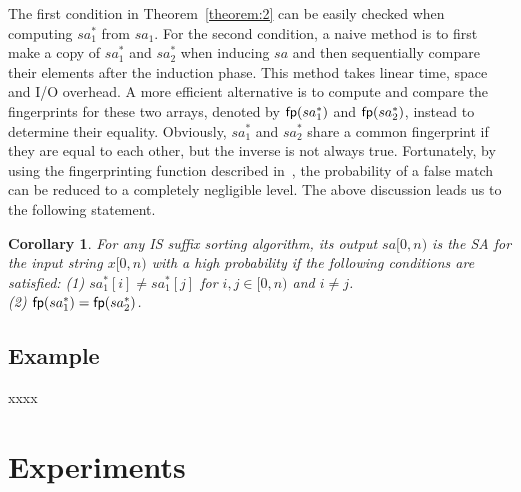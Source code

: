 \documentclass[10pt,journal,compsoc]{IEEEtran}
\newtheorem{corollary}[theorem]{Corollary}
\begin{document}
The first condition in Theorem~\ref{theorem:2} can be easily checked when computing $sa^*_1$ from $sa_1$. For the second condition, a naive method is to first make a copy of $sa^*_1$ and $sa^*_2$ when inducing $sa$ and then sequentially compare their elements after the induction phase. This method takes linear time, space and I/O overhead. A more efficient alternative is to compute and compare the fingerprints for these two arrays, denoted by ${\sf fp}(sa^*_1)$ and ${\sf fp}(sa^*_2)$, instead to determine their equality. Obviously, $sa^*_1$ and $sa^*_2$ share a common fingerprint if they are equal to each other, but the inverse is not always true. Fortunately, by using the fingerprinting function described in~\cite{Karp1987}, the probability of a false match can be reduced to a completely negligible level. The above discussion leads us to the following statement.

\begin{corollary} \label{theorem:3}
	For any IS suffix sorting algorithm, its output $sa[0, n)$ is the SA for the input string $x[0, n)$ with a high probability if the following conditions are satisfied:
	(1) $sa^*_1[i] \ne sa^*_1[j]$ for $i, j \in [0, n)$ and $i \ne j$. \\
	(2) ${\sf fp}(sa^*_1) = {\sf fp}(sa^*_2)$. \\
\end{corollary}


\subsection{Example} \label{sec:check_sa:example}

xxxx


\section{Experiments} \label{sec:experiments}
\end{document}
